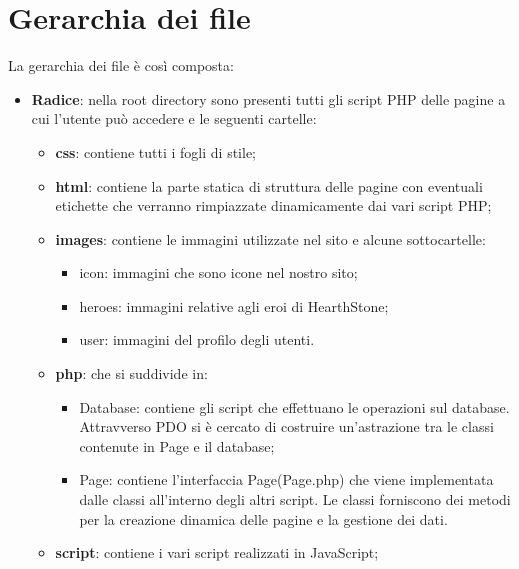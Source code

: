 \section{Gerarchia dei file}
La gerarchia dei file è così composta:
\begin{itemize}
	\item \textbf{Radice}: nella root directory sono presenti tutti gli script PHP delle pagine a cui l'utente può accedere e le seguenti cartelle:
	\begin{itemize}
		\item \textbf{css}: contiene tutti i fogli di stile;
		\item \textbf{html}: contiene la parte statica di struttura delle pagine con eventuali etichette che verranno rimpiazzate dinamicamente dai vari script PHP;
		\item \textbf{images}: contiene le immagini utilizzate nel sito e alcune sottocartelle:
		\begin{itemize}
			\item{icon}: immagini che sono icone nel nostro sito;
			\item{heroes}: immagini relative agli eroi di HearthStone;
			\item{user}: immagini del profilo degli utenti.
		\end{itemize}
		\item \textbf{php}: che si suddivide in:
		\begin{itemize}
			\item {Database}: contiene gli script che effettuano le operazioni sul database. Attravverso PDO si è cercato di costruire un'astrazione tra le classi contenute in Page e il database;
			\item {Page}: contiene l'interfaccia Page(Page.php) che viene implementata dalle classi all'interno degli altri script. Le classi forniscono dei metodi per la creazione dinamica delle pagine e la gestione dei dati.
		\end{itemize}
		\item \textbf{script}: contiene i vari script realizzati in JavaScript;
	\end{itemize}
\end{itemize}


\newpage